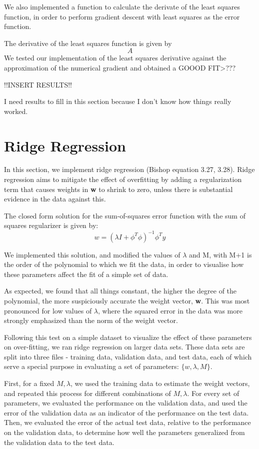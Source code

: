 \documentclass[11pt]{article}
\newcommand{\?}[0]{\vert}
\begin{document}
We also implemented a function to calculate the derivate of the least squares function, in order to perform gradient descent with least squares as the error function.

The derivative of the least squares function is given by 
$$ A $$
We tested our implementation of the least squares derivative against the approximation of the numerical gradient and obtained a GOOOD FIT>???

!!INSERT RESULTS!!

I need results to fill in this section because I don't know how things really worked.
\section{Ridge Regression}

In this section, we implement ridge regression (Bishop equation 3.27, 3.28). Ridge regression aims to mitigate the effect of overfitting by adding a regularization term that causes weights in \textbf{w} to shrink to zero, unless there is substantial evidence in the data against this.

The closed form solution for the sum-of-squares error function with the sum of squares regularizer is given by:
$$ w = (\lambda I + \phi^T\phi)^{-1} \phi^Ty$$ 

We implemented this solution, and modified the values of $\lambda$ and M, with M+1 is the order of the polynomial to which we fit the data, in order to visualise how these parameters affect the fit of a simple set of data.

As expected, we found that all things constant, the higher the degree of the polynomial, the more suspiciously accurate the weight vector, \textbf{w}. This was most pronounced for low values of $\lambda$, where the squared error in the data was more strongly emphasized than the norm of the weight vector.


Following this test on a simple dataset to visualize the effect of these parameters on over-fitting, we ran ridge regression on larger data sets. These data sets are split into three files - training data, validation data, and test data, each of which serve a special purpose in evaluating a set of parameters: $\{w, \lambda, M\}$.

First, for a fixed $M, \lambda$, we used the training data to estimate the weight vectors, and repeated this process for different combinations of $M, \lambda$. For every set of parameters, we evaluated the performance on the validation data, and used the error of the validation data as an indicator of the performance on the test data. Then, we evaluated the error of the actual test data, relative to the performance on the validation data, to determine how well the parameters generalized from the validation data to the test data.
\end{document}
